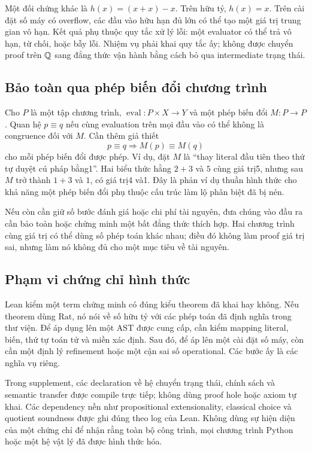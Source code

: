 Một đối chứng khác là $h(x)=(x+x)-x$. Trên hữu tỷ, $h(x)=x$. Trên cài đặt số máy có overflow, các đầu vào hữu hạn đủ lớn có thể tạo một giá trị trung gian vô hạn. Kết quả phụ thuộc quy tắc xử lý lỗi: một evaluator có thể trả vô hạn, từ chối, hoặc bẫy lỗi. Nhiệm vụ phải khai quy tắc ấy; không được chuyển proof trên $\mathbb Q$ sang đẳng thức vận hành bằng cách bỏ qua intermediate trạng thái.

\subsection{Bảo toàn qua phép biến đổi chương trình}
Cho $P$ là một tập chương trình, $\operatorname{eval}:P\times X\to Y$ và một phép biến đổi $M:P\to P$. Quan hệ $p\equiv q$ nếu cùng evaluation trên mọi đầu vào có thể không là congruence đối với $M$. Cần thêm giả thiết
\[
p\equiv q\Longrightarrow M(p)\equiv M(q)
\]
cho mỗi phép biến đổi được phép. Ví dụ, đặt $M$ là ``thay literal đầu tiên theo thứ tự duyệt cú pháp bằng1''. Hai biểu thức hằng $2+3$ và $5$ cùng giá trị5, nhưng sau $M$ trở thành $1+3$ và $1$, có giá trị4 và1. Đây là phản ví dụ thuần hình thức cho khả năng một phép biến đổi phụ thuộc cấu trúc làm lộ phân biệt đã bị nén.

Nếu còn cần giữ số bước đánh giá hoặc chi phí tài nguyên, đưa chúng vào đầu ra cần bảo toàn hoặc chứng minh một bất đẳng thức thích hợp. Hai chương trình cùng giá trị có thể dùng số phép toán khác nhau; điều đó không làm proof giá trị sai, nhưng làm nó không đủ cho một mục tiêu về tài nguyên.

\subsection{Phạm vi chứng chỉ hình thức}
Lean kiểm một term chứng minh có đúng kiểu theorem đã khai hay không. Nếu theorem dùng $\mathrm{Rat}$, nó nói về số hữu tỷ với các phép toán đã định nghĩa trong thư viện. Để áp dụng lên một AST được cung cấp, cần kiểm mapping literal, biến, thứ tự toán tử và miền xác định. Sau đó, để áp lên một cài đặt số máy, còn cần một định lý refinement hoặc một cận sai số operational. Các bước ấy là các nghĩa vụ riêng.

Trong supplement, các declaration về hệ chuyển trạng thái, chính sách và semantic transfer được compile trực tiếp; không dùng proof hole hoặc axiom tự khai. Các dependency nền như propositional extensionality, classical choice và quotient soundness được ghi đúng theo log của Lean. Không dùng sự hiện diện của một chứng chỉ để nhận rằng toàn bộ công trình, mọi chương trình Python hoặc một hệ vật lý đã được hình thức hóa.

